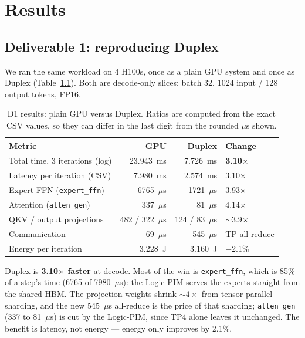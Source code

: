 \documentclass[11pt,a4paper]{report}
\begin{document}
\chapter{Results}
\label{ch:results}

\section{Deliverable 1: reproducing Duplex}

We ran the same workload on 4 H100s, once as a plain GPU system and once as Duplex (Table~\ref{tab:d1}). Both are decode-only slices: batch 32, 1024 input / 128 output tokens, FP16.

\begin{table}[htbp]
\centering
\caption{D1 results: plain GPU versus Duplex. Ratios are computed from the exact CSV values, so they can differ in the last digit from the rounded $\mu$s shown.}
\label{tab:d1}
\begin{tabular}{lrrl}
\toprule
Metric & GPU & Duplex & Change \\
\midrule
Total time, 3 iterations (log) & 23.943~ms & 7.726~ms & \textbf{3.10$\times$} \\
Latency per iteration (CSV) & 7.980~ms & 2.574~ms & 3.10$\times$ \\
Expert FFN (\texttt{expert\_ffn}) & 6765~$\mu$s & 1721~$\mu$s & 3.93$\times$ \\
Attention (\texttt{atten\_gen}) & 337~$\mu$s & 81~$\mu$s & 4.14$\times$ \\
QKV / output projections & 482 / 322~$\mu$s & 124 / 83~$\mu$s & $\sim$3.9$\times$ \\
Communication & 69~$\mu$s & 545~$\mu$s & TP all-reduce \\
Energy per iteration & 3.228~J & 3.160~J & $-$2.1\% \\
\bottomrule
\end{tabular}
\end{table}

Duplex is \textbf{3.10$\times$ faster} at decode. Most of the win is \texttt{expert\_ffn}, which is 85\% of a step's time (6765 of 7980~$\mu$s): the Logic-PIM serves the experts straight from the shared HBM. The projection weights shrink $\sim 4\times$ from tensor-parallel sharding, and the new 545~$\mu$s all-reduce is the price of that sharding; \texttt{atten\_gen} (337 to 81~$\mu$s) is cut by the Logic-PIM, since TP4 alone leaves it unchanged. The benefit is latency, not energy --- energy only improves by 2.1\%.
\end{document}
